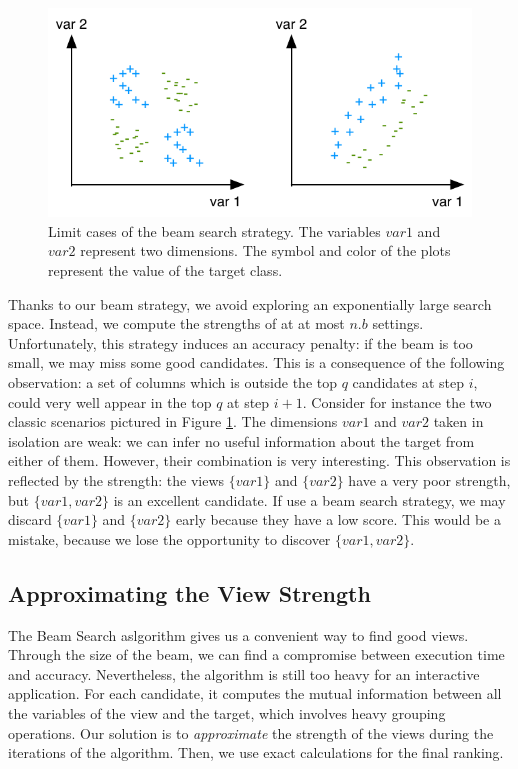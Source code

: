 \begin{figure}[t!]
\centering
\includegraphics[width=0.8\columnwidth]{images/strength-jump}
\caption{Limit cases of the beam search strategy. The variables $var1$ and
$var2$ represent two dimensions. The symbol and color of the plots represent
the value of the target class. }
\label{pic:strength-jump}
\end{figure}
Thanks to our beam strategy, we avoid exploring an exponentially large search
space. Instead, we compute the strengths of at at most $n.b$ settings.
Unfortunately, this strategy induces an accuracy penalty: if the beam is too
small, we may miss some good candidates. This is a consequence of the following
observation: a set of columns which is outside the top $q$ candidates at step
$i$, could very well appear in the top $q$ at step $i+1$. Consider for instance
the two classic scenarios pictured in Figure \ref{pic:strength-jump}. The
dimensions $var1$ and $var2$ taken in isolation are weak: we can infer no
useful information about the target from either of them. However, their
combination is very interesting.  This observation is reflected by the
strength: the views $\{var1\}$ and $\{var2\}$ have a very poor strength, but
$\{var1, var2\}$ is an excellent candidate. If use a beam search strategy, we
may discard  $\{var1\}$ and $\{var2\}$ early because they have a low score.
This would be a mistake, because we lose the opportunity to discover $\{var1,
var2\}$.

\subsection{Approximating the View Strength}
\label{sec:approx}

The Beam Search aslgorithm gives us a convenient way to find good views.
Through the size of the beam, we can find a compromise between execution time
and accuracy.  Nevertheless, the algorithm is still too heavy for an
interactive application. For each candidate, it computes the mutual information
between all the variables of the view and the target, which involves heavy grouping
operations. Our solution is to \emph{approximate} the strength of the views
during the iterations of the algorithm. Then, we use exact calculations for the
final ranking.


